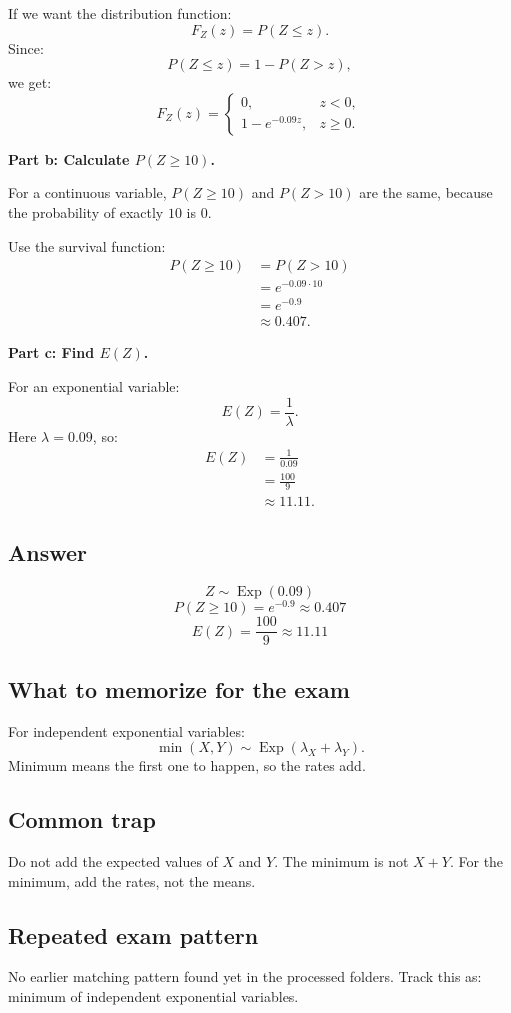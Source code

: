 \documentclass[11pt,a4paper]{article}
\begin{document}
If we want the distribution function:
\[
F_Z(z)=P(Z\le z).
\]
Since:
\[
P(Z\le z)=1-P(Z>z),
\]
we get:
\[
F_Z(z)=
\begin{cases}
0, & z<0,\\
1-e^{-0.09z}, & z\ge 0.
\end{cases}
\]

\textbf{Part b: Calculate \(P(Z\ge 10)\).}

For a continuous variable, \(P(Z\ge 10)\) and \(P(Z>10)\) are the same, because the probability of exactly \(10\) is \(0\).

Use the survival function:
\begin{align*}
P(Z\ge 10)
&=P(Z>10)\\
&=e^{-0.09\cdot 10}\\
&=e^{-0.9}\\
&\approx 0.407.
\end{align*}

\textbf{Part c: Find \(E(Z)\).}

For an exponential variable:
\[
E(Z)=\frac{1}{\lambda}.
\]
Here \(\lambda=0.09\), so:
\begin{align*}
E(Z)
&=\frac{1}{0.09}\\
&=\frac{100}{9}\\
&\approx 11.11.
\end{align*}

\subsection*{Answer}
\[
\boxed{Z\sim \operatorname{Exp}(0.09)}
\]
\[
\boxed{P(Z\ge 10)=e^{-0.9}\approx 0.407}
\]
\[
\boxed{E(Z)=\frac{100}{9}\approx 11.11}
\]

\subsection*{What to memorize for the exam}
For independent exponential variables:
\[
\min(X,Y)\sim \operatorname{Exp}(\lambda_X+\lambda_Y).
\]
Minimum means the first one to happen, so the rates add.

\subsection*{Common trap}
Do not add the expected values of \(X\) and \(Y\). The minimum is not \(X+Y\). For the minimum, add the rates, not the means.

\subsection*{Repeated exam pattern}
No earlier matching pattern found yet in the processed folders. Track this as: minimum of independent exponential variables.
\end{document}
